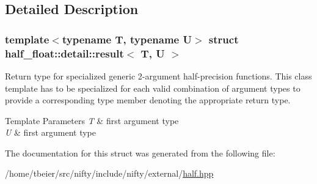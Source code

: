 \subsection{Detailed Description}
\subsubsection*{template$<$typename T, typename U$>$\newline
struct half\+\_\+float\+::detail\+::result$<$ T, U $>$}

Return type for specialized generic 2-\/argument half-\/precision functions. This class template has to be specialized for each valid combination of argument types to provide a corresponding {\ttfamily type} member denoting the appropriate return type. 
\begin{DoxyTemplParams}{Template Parameters}
{\em T} & first argument type \\
\hline
{\em U} & first argument type \\
\hline
\end{DoxyTemplParams}


The documentation for this struct was generated from the following file\+:\begin{DoxyCompactItemize}
\item 
/home/tbeier/src/nifty/include/nifty/external/\hyperlink{half_8hpp}{half.\+hpp}\end{DoxyCompactItemize}
